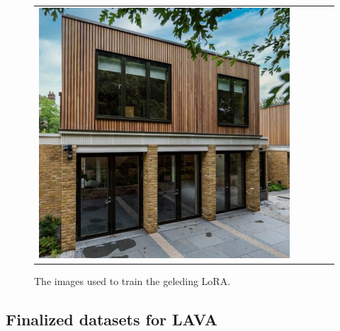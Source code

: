 \begin{figure}[H]
{\begin{tabular}{@{}ccccc@{}}
      \includegraphics[width=\linewidth]{Images/LoRAs/Geleding/Training_images/15.jpg} \\
    \end{tabular}%
  }
  \caption{The images used to train the geleding LoRA.}
  \label{fig:gridgeleding}
\end{figure}

\subsection{Finalized datasets for LAVA}

